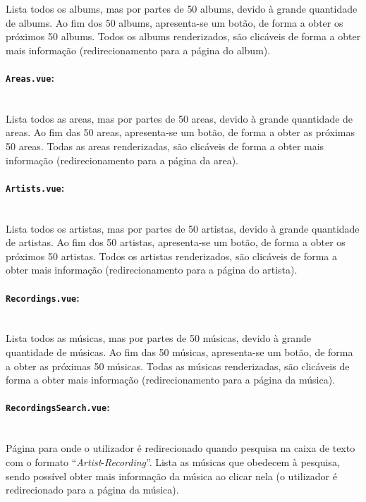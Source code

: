 \documentclass{article}
\begin{document}
Lista todos os albums, mas por partes de 50 albums, devido à grande quantidade de albums. Ao fim dos 50 albums, apresenta-se um botão, de forma a obter os próximos 50 albums. Todos os albums renderizados, são clicáveis de forma a obter mais informação (redirecionamento para a página do album).

\paragraph{\texttt{Areas.vue}:}\mbox{}\\

Lista todos as areas, mas por partes de 50 areas, devido à grande quantidade de areas. Ao fim das 50 areas, apresenta-se um botão, de forma a obter as próximas 50 areas. Todas as areas renderizadas, são clicáveis de forma a obter mais informação (redirecionamento para a página da area).

\paragraph{\texttt{Artists.vue}:}\mbox{}\\

Lista todos os artistas, mas por partes de 50 artistas, devido à grande quantidade de artistas. Ao fim dos 50 artistas, apresenta-se um botão, de forma a obter os próximos 50 artistas. Todos os artistas renderizados, são clicáveis de forma a obter mais informação (redirecionamento para a página do artista).

\paragraph{\texttt{Recordings.vue}:}\mbox{}\\

Lista todos as músicas, mas por partes de 50 músicas, devido à grande quantidade de músicas. Ao fim das 50 músicas, apresenta-se um botão, de forma a obter as próximas 50 músicas. Todas as músicas renderizadas, são clicáveis de forma a obter mais informação (redirecionamento para a página da música).

\paragraph{\texttt{RecordingsSearch.vue}:}\mbox{}\\

Página para onde o utilizador é redirecionado quando pesquisa na caixa de texto com o formato ``\textit{Artist}-\textit{Recording}''. Lista as músicas que obedecem à pesquisa, sendo possível obter mais informação da música ao clicar nela (o utilizador é redirecionado para a página da música).
\end{document}
